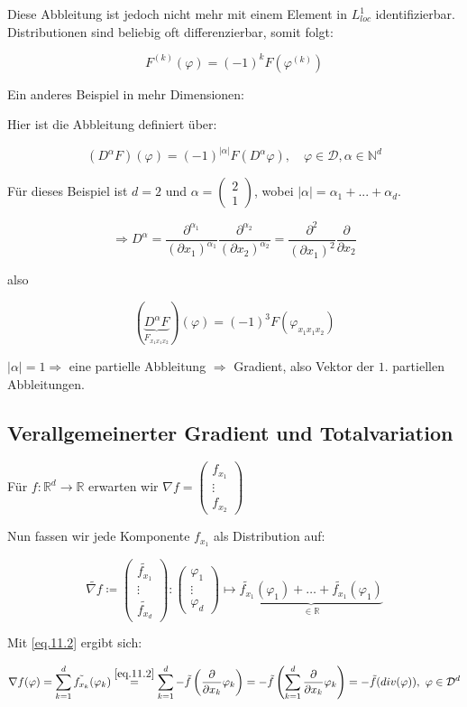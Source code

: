 \documentclass{article}
\theoremstyle{plain}
\theoremstyle{definition}
\numberwithin{equation}{section}
\newcommand{\abs}[1] {
\left| #1 \right|
}
\newcommand{\R}[0] {
\mathbb R
}
\newcommand{\N}[0] {
    \mathbb N
}
\newcommand{\srmatrix}[1] {
\left( \begin{smallmatrix} #1 \end{smallmatrix} \right)
}
\newcommand{\mat}[1] {
\begin{pmatrix} #1 \end{pmatrix}
}
\begin{document}
Diese Abbleitung ist jedoch nicht mehr mit einem Element in $L^1_{loc}$ identifizierbar.
Distributionen sind beliebig oft differenzierbar, somit folgt:

\[F^{(k)}(\varphi) = (-1)^kF(\varphi^{(k)})\]

Ein anderes Beispiel in mehr Dimensionen:

Hier ist die Abbleitung definiert über:

\[(D^\alpha F)(\varphi) = (-1)^{\abs{\alpha}}F(D^{\alpha} \varphi), \quad \varphi \in \mathcal{D}, \alpha \in \N^d\]

Für dieses Beispiel ist $d=2$ und $\alpha = \mat{2\\1}$, wobei $\abs{\alpha} = \alpha_1 + ... +\alpha_d$.

\[\Rightarrow D^\alpha = \frac{\partial^{\alpha_1}}{(\partial x_1)^{\alpha_1}}\frac{\partial^{\alpha_2}}{(\partial x_2)^{\alpha_2}} = \frac{\partial^{2}}{(\partial x_1)^{2}} \frac{\partial}{\partial x_2}\]

also

\[(\underbrace{D^\alpha F}_{F_{x_1 x_1 x_2}})(\varphi) = (-1)^{3}F(\varphi_{x_1 x_1 x_2})\]

$\abs{\alpha}=1 \Rightarrow $ eine partielle Abbleitung $\Rightarrow$ Gradient, also Vektor der $1.$ partiellen Abbleitungen.

\subsection{Verallgemeinerter Gradient und Totalvariation}

Für $f:\R^d \to \R$ erwarten wir $\nabla f = \srmatrix{f_{x_1} \\ \vdots \\ f_{x_2}}$

Nun fassen wir jede Komponente $f_{x_1}$ als Distribution auf:

\[\tilde{\nabla f} \coloneqq \mat{\tilde{f_{x_1}}\\ \vdots \\ \tilde{f_{x_d}}}: \mat{\varphi_1 \\ \vdots \\ \varphi_d} \mapsto \underbrace{\tilde{f_{x_1}}(\varphi_1) + \hdots + \tilde{f_{x_1}}(\varphi_1)}_{\in \R}\]

Mit \eqref{eq.11.2} ergibt sich:

\begin{equation}\label{eq.11.3}
    \nabla f(\varphi)=\sum_{k=1}^d \tilde{f_{x_k}}(\varphi_k) \overset{\eqref{eq.11.2}}{=} \sum_{k=1}^d - \tilde{f}\left(\frac{\partial}{\partial x_k} \varphi_k \right) = -\tilde{f} \left( \sum_{k=1}^d \frac{\partial}{\partial x_k} \varphi_k \right) = - \tilde f (div(\varphi)), \ \varphi \in \mathcal{D}^d
\end{equation}
\end{document}
